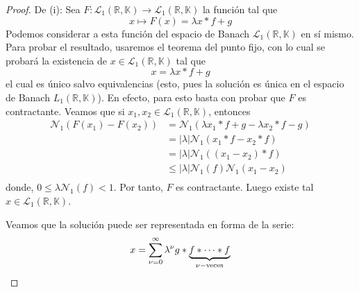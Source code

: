 \documentclass[12pt]{report}
\newcounter{it}
\theoremstyle{largebreak}
\newcommand\abs[1]{\ensuremath{\left|#1\right|}}
\newcommand\cf[3]{\ensuremath{#1:#2\rightarrow#3}}
\newcommand{\N}[2]{\ensuremath{\mathcal{N}_{#1}\left(#2\right)}}
\begin{document}
    \begin{proof}
        De (i): Sea $\cf{F}{\mathcal{L}_1(\mathbb{R},\mathbb{K})}{\mathcal{L}_1(\mathbb{R},\mathbb{K})}$ la función tal que
        \begin{equation*}
            x\mapsto F(x)=\lambda x*f+g
        \end{equation*}
        Podemos considerar a esta función del espacio de Banach $\mathcal{L}_1(\mathbb{R},\mathbb{K})$ en sí mismo. Para probar el resultado, usaremos el teorema del punto fijo, con lo cual se probará la existencia de $x\in\mathcal{L}_1(\mathbb{R},\mathbb{K})$ tal que
        \begin{equation*}
            x=\lambda x*f+g
        \end{equation*}
        el cual es único salvo equivalencias (esto, pues la solución es única en el espacio de Banach $L_1(\mathbb{R},\mathbb{K})$). En efecto, para esto basta con probar que $F$ es contractante. Veamos que si $x_1,x_2\in\mathcal{L}_1(\mathbb{R},\mathbb{K})$, entonces
        \begin{equation*}
            \begin{split}
                \N{1}{F(x_1)-F(x_2)}&=\N{1}{\lambda x_1*f+g-\lambda x_2*f-g}\\
                &=\abs{\lambda}\N{1}{x_1*f-x_2*f}\\
                &=\abs{\lambda}\N{1}{(x_1-x_2)*f}\\
                &\leq\abs{\lambda}\N{1}{f}\N{1}{x_1-x_2}\\
            \end{split}
        \end{equation*}
        donde, $0\leq\lambda\N{1}{f}<1$. Por tanto, $F$ es contractante. Luego existe tal $x\in\mathcal{L}_1(\mathbb{R},\mathbb{K})$.

        Veamos que la solución puede ser representada en forma de la serie:
        \begin{equation*}
            x=\sum_{\nu=0}^\infty\lambda^\nu g*\underbrace{f*\cdots*f}_{\nu-\textup{veces}}
        \end{equation*}
        

\end{proof}
\end{document}
